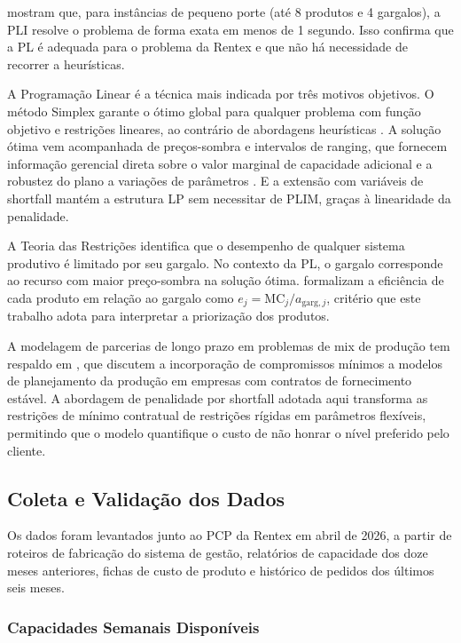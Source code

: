 \textcite{sobreiro2013} mostram que, para instâncias de pequeno porte (até 8
produtos e 4 gargalos), a PLI resolve o problema de forma exata em menos de 1
segundo. Isso confirma que a PL é adequada para o problema da Rentex e que
não há necessidade de recorrer a heurísticas.

A Programação Linear é a técnica mais indicada por três motivos objetivos. O
método Simplex garante o ótimo global para qualquer problema com função objetivo
e restrições lineares, ao contrário de abordagens heurísticas \cite{hillier2006}.
A solução ótima vem acompanhada de preços-sombra e intervalos de ranging,
que fornecem informação gerencial direta sobre o valor marginal de capacidade
adicional e a robustez do plano a variações de parâmetros \cite{winston2002}.
E a extensão com variáveis de shortfall mantém a estrutura LP sem necessitar
de PLIM, graças à linearidade da penalidade.

A Teoria das Restrições \cite{goldratt2006} identifica que o desempenho de
qualquer sistema produtivo é limitado por seu gargalo. No contexto da PL, o
gargalo corresponde ao recurso com maior preço-sombra na solução ótima.
\textcite{sobreiro2013} formalizam a eficiência de cada produto em relação ao
gargalo como $e_j = \mathrm{MC}_j / a_{\text{garg},j}$, critério que este
trabalho adota para interpretar a priorização dos produtos.

A modelagem de parcerias de longo prazo em problemas de mix de produção tem
respaldo em \textcite{arenales2007}, que discutem a incorporação de compromissos
mínimos a modelos de planejamento da produção em empresas com contratos de
fornecimento estável. A abordagem de penalidade por shortfall adotada aqui
transforma as restrições de mínimo contratual de restrições rígidas em
parâmetros flexíveis, permitindo que o modelo quantifique o custo de não honrar
o nível preferido pelo cliente.

\newpage

\subsection{Coleta e Validação dos Dados}

Os dados foram levantados junto ao PCP da Rentex em abril de 2026, a partir de
roteiros de fabricação do sistema de gestão, relatórios de capacidade dos doze
meses anteriores, fichas de custo de produto e histórico de pedidos dos últimos
seis meses.

\subsubsection{Capacidades Semanais Disponíveis}

